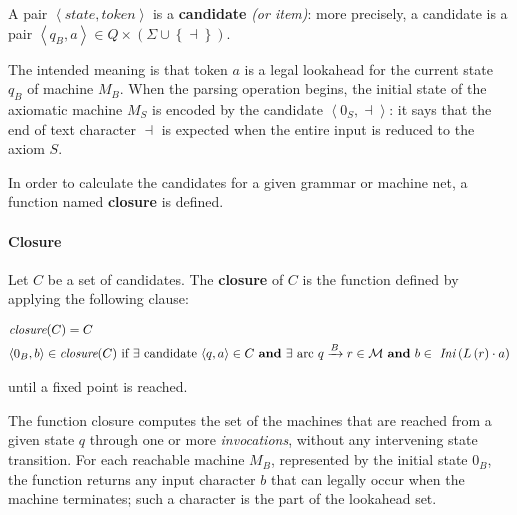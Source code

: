 \documentclass[english]{article}
\begin{document}
A pair \(\left\langle \textit{state}, \textit{token} \right\rangle\) is a \textbf{candidate} \textit{(or item)}:
more precisely, a candidate is a pair \(\left\langle q_B, a \right\rangle \in Q \times \left( \Sigma \cup \left\{ \dashv \right\} \right)\).

The intended meaning is that token \(a\) is a legal lookahead for the current state \(q_B\) of machine \(M_B\).
When the parsing operation begins, the initial state of the axiomatic machine \(M_S\) is encoded by the candidate \(\left\langle 0_S, \dashv \right\rangle\):
it says that the end of text character \(\dashv\) is expected when the entire input is reduced to the axiom \(S\).

In order to calculate the candidates for a given grammar or machine net, a function named \textbf{closure} is defined.

\paragraph{Closure}
\label{par:closure}

Let \(C\) be a set of candidates.
The \textbf{closure} of \(C\) is the function defined by applying the following clause:

\begin{gather*}
  \begin{aligned}
     & \textit{closure}(C) = C                                                                                                                                                                                                                                                 \\
     & \langle 0_B, b \rangle \in \textit{closure}(C) \ \text{if} \ \exists \ \text{candidate} \ \langle q,a \rangle \in C \ \textbf{and} \ \exists \ \text{arc} \  q\xrightarrow{B} r \in \mathcal{M} \ \textbf{and} \ b \in \ \Ini \left( L \left( r \right) \cdot a \right) \\
  \end{aligned}
\end{gather*}

until a fixed point is reached.

\bigskip
The function closure computes the set of the machines that are reached from a given state \(q\) through one or more \textit{invocations}, without any intervening state transition.
For each reachable machine \(M_B\), represented by the initial state \(0_B\), the function returns any input character \(b\) that can legally occur when the machine terminates;
such a character is the part of the lookahead set.
\end{document}
